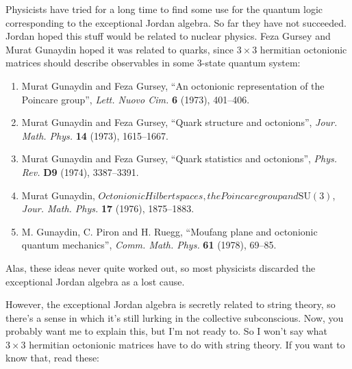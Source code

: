 \documentclass{article}
\renewcommand{\texttt}[1]{%
  \begingroup
  \ttfamily
  \begingroup\lccode`~=`/\lowercase{\endgroup\def~}{/\discretionary{}{}{}}%
  \begingroup\lccode`~=`[\lowercase{\endgroup\def~}{[\discretionary{}{}{}}%
  \begingroup\lccode`~=`.\lowercase{\endgroup\def~}{.\discretionary{}{}{}}%
  \catcode`/=\active\catcode`[=\active\catcode`.=\active
  \scantokens{#1\noexpand}%
  \endgroup
}
\begin{document}
Physicists have tried for a long time to find some use for the quantum
logic corresponding to the exceptional Jordan algebra. So far they have
not succeeded. Jordan hoped this stuff would be related to nuclear
physics. Feza Gursey and Murat Gunaydin hoped it was related to quarks,
since \(3\times3\) hermitian octonionic matrices should describe
observables in some 3-state quantum system:

\begin{enumerate}
\def\labelenumi{\arabic{enumi})}
\setcounter{enumi}{9}
\item
  Murat Gunaydin and Feza Gursey, ``An octonionic representation of the
  Poincare group'', \emph{Lett. Nuovo Cim.} \textbf{6} (1973), 401--406.
\item
  Murat Gunaydin and Feza Gursey, ``Quark structure and octonions'',
  \emph{Jour. Math. Phys.} \textbf{14} (1973), 1615--1667.
\item
  Murat Gunaydin and Feza Gursey, ``Quark statistics and octonions'',
  \emph{Phys. Rev.} \textbf{D9} (1974), 3387--3391.
\item
  Murat Gunaydin,
  \(Octonionic Hilbert spaces, the Poincare group and \mathrm{SU}(3)\),
  \emph{Jour. Math. Phys.} \textbf{17} (1976), 1875--1883.
\item
  M. Gunaydin, C. Piron and H. Ruegg, ``Moufang plane and octonionic
  quantum mechanics'', \emph{Comm. Math. Phys.} \textbf{61} (1978),
  69--85.
\end{enumerate}

Alas, these ideas never quite worked out, so most physicists discarded
the exceptional Jordan algebra as a lost cause.

However, the exceptional Jordan algebra is secretly related to string
theory, so there's a sense in which it's still lurking in the collective
subconscious. Now, you probably want me to explain this, but I'm not
ready to. So I won't say what \(3\times3\) hermitian octonionic matrices
have to do with string theory. If you want to know that, read these:

\end{document}
